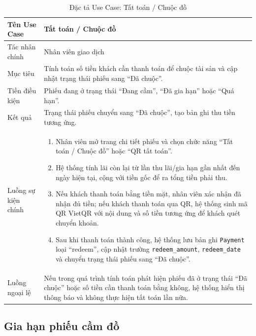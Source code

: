 \documentclass[13pt,a4paper]{extreport}
\begin{document}
\begin{table}[H]
\centering
\caption{Đặc tả Use Case: Tất toán / Chuộc đồ}
\label{tab:uc-redeem}
\begin{tabular}{p{4cm}p{10cm}}
\hline
Tên Use Case & Tất toán / Chuộc đồ\\
\hline
Tác nhân chính & Nhân viên giao dịch\\
Mục tiêu & Tính toán số tiền khách cần thanh toán để chuộc tài sản và cập nhật trạng thái phiếu sang ``Đã chuộc''.\\
Tiền điều kiện & Phiếu đang ở trạng thái ``Đang cầm'', ``Đã gia hạn'' hoặc ``Quá hạn''.\\
Kết quả & Trạng thái phiếu chuyển sang ``Đã chuộc'', tạo bản ghi thu tiền tương ứng.\\
\hline
Luồng sự kiện chính &
\begin{enumerate}
  \item Nhân viên mở trang chi tiết phiếu và chọn chức năng ``Tất toán / Chuộc đồ'' hoặc ``QR tất toán''.
  \item Hệ thống tính lãi còn lại từ lần thu lãi/gia hạn gần nhất đến ngày hiện tại, cộng với tiền gốc để ra tổng tiền phải thu.
  \item Nếu khách thanh toán bằng tiền mặt, nhân viên xác nhận đã nhận đủ tiền; nếu khách thanh toán qua QR, hệ thống sinh mã QR VietQR với nội dung và số tiền tương ứng để khách quét chuyển khoản.
  \item Sau khi thanh toán thành công, hệ thống lưu bản ghi \texttt{Payment} loại ``redeem'', cập nhật trường \texttt{redeem\_amount}, \texttt{redeem\_date} và chuyển trạng thái phiếu sang ``Đã chuộc''.
\end{enumerate}\\
\hline
Luồng ngoại lệ &
Nếu trong quá trình tính toán phát hiện phiếu đã ở trạng thái ``Đã chuộc'' hoặc số tiền cần thanh toán bằng không, hệ thống hiển thị thông báo và không thực hiện tất toán lần nữa.\\
\hline
\end{tabular}
\end{table}

\subsection*{Gia hạn phiếu cầm đồ}
\end{document}
